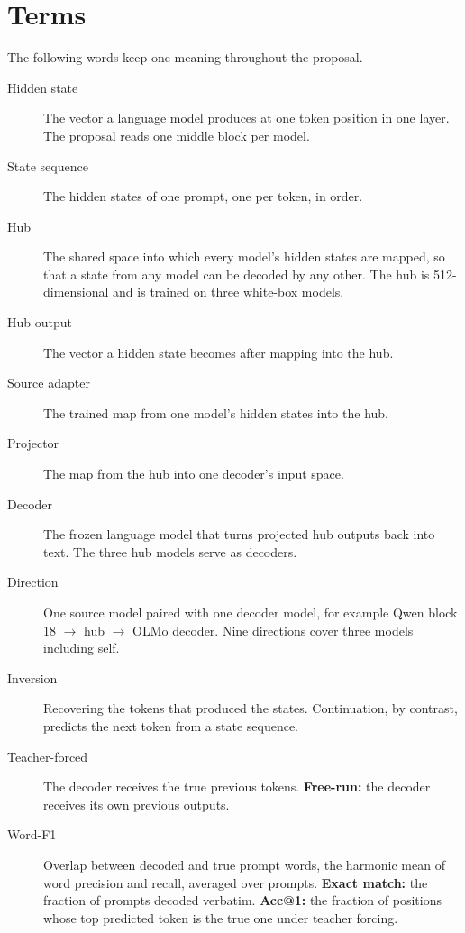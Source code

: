 \section{Terms}\label{sec:hub:terms}

The following words keep one meaning throughout the proposal.

\begin{description}
\item[Hidden state] The vector a language model produces at one token position in one layer. The proposal reads one middle block per model.
\item[State sequence] The hidden states of one prompt, one per token, in order.
\item[Hub] The shared space into which every model's hidden states are mapped, so that a state from any model can be decoded by any other. The hub is 512-dimensional and is trained on three white-box models.
\item[Hub output] The vector a hidden state becomes after mapping into the hub.
\item[Source adapter] The trained map from one model's hidden states into the hub.
\item[Projector] The map from the hub into one decoder's input space.
\item[Decoder] The frozen language model that turns projected hub outputs back into text. The three hub models serve as decoders.
\item[Direction] One source model paired with one decoder model, for example Qwen block 18 $\to$ hub $\to$ OLMo decoder. Nine directions cover three models including self.
\item[Inversion] Recovering the tokens that produced the states. Continuation, by contrast, predicts the next token from a state sequence.
\item[Teacher-forced] The decoder receives the true previous tokens. \textbf{Free-run:} the decoder receives its own previous outputs.
\item[Word-F1] Overlap between decoded and true prompt words, the harmonic mean of word precision and recall, averaged over prompts. \textbf{Exact match:} the fraction of prompts decoded verbatim. \textbf{Acc@1:} the fraction of positions whose top predicted token is the true one under teacher forcing.
\end{description}
